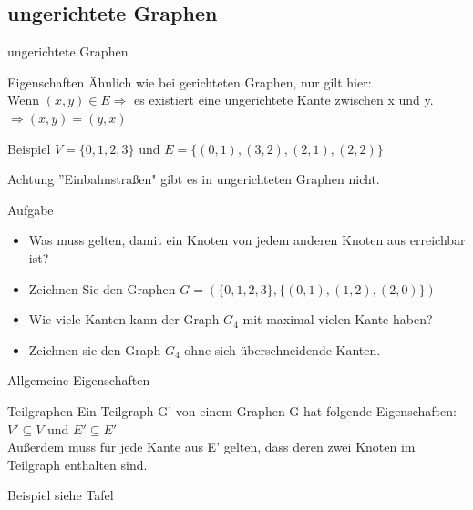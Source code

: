 	\subsection{ungerichtete Graphen}
	\begin{frame}{ungerichtete Graphen}
		\begin{block}{Eigenschaften}
			Ähnlich wie bei gerichteten Graphen, nur gilt hier:\\
			Wenn $(x,y) \in E \Rightarrow$ es existiert eine ungerichtete Kante zwischen x und y.
			$\Rightarrow(x,y) = (y,x)$\\
		\end{block}
		
		\pause
		\begin{exampleblock}{Beispiel}
			$ V = \{0, 1, 2, 3\}$ und $E = \{(0,1), (3,2), (2,1), (2,2)\}$
		\end{exampleblock}
		
		\pause
		\begin{alertblock}{Achtung}
			''Einbahnstraßen" gibt es in ungerichteten Graphen nicht.
		\end{alertblock}
	\end{frame}
	
	
	\begin{frame}{Aufgabe}
		\begin{itemize}
			\item Was muss gelten, damit ein Knoten von jedem anderen Knoten aus erreichbar ist?
		
			\pause
			\item Zeichnen Sie den Graphen $G=(\{0,1,2,3\}, \{(0,1), (1,2), (2,0)\})$
		
			\pause
			\item Wie viele Kanten kann der Graph $G_4$ mit maximal vielen Kante haben?
		
			\pause
			\item Zeichnen sie den  Graph $G_4$ ohne sich überschneidende Kanten.
		\end{itemize}
	
	\end{frame}
	
	
	
	\begin{frame}{Allgemeine Eigenschaften}
		 \begin{block}{Teilgraphen}
			Ein Teilgraph G' von einem Graphen G hat folgende Eigenschaften:\\
			$V' \subseteq V$ und $E' \subseteq E'$\\
			Außerdem muss für jede Kante aus E' gelten, dass deren zwei Knoten im Teilgraph enthalten sind.
		 \end{block}
		 
		 \begin{exampleblock}{Beispiel}
		 	siehe Tafel
		 \end{exampleblock}
	\end{frame}
	
